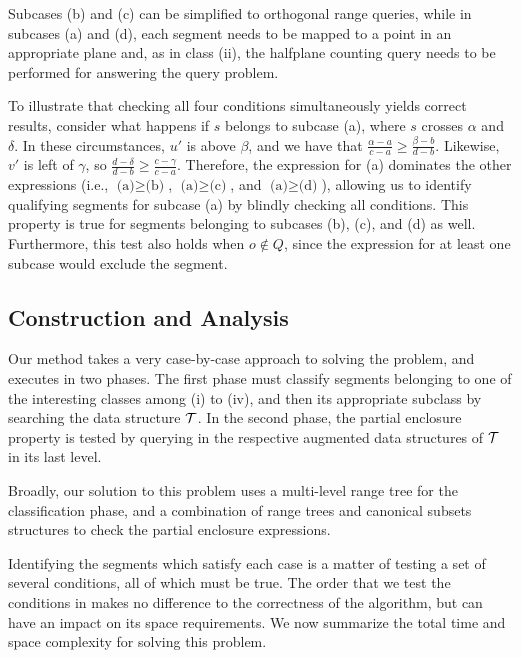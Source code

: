 Subcases (b) and (c) can be simplified to orthogonal range 
queries, while in subcases (a) and (d), each segment needs to be mapped to 
a point in an appropriate plane and, as in class 
(ii), the halfplane counting query needs to be performed for answering 
the query problem. 

To illustrate that checking all four conditions simultaneously 
yields correct results, consider what happens if $s$ belongs 
to subcase (a), where $s$ crosses $\alpha$ and $\delta$. In 
these circumstances, $u'$ is above $\beta$, and we have that 
$\frac{\alpha - a}{c - a} \geq \frac{\beta - b}{d - b}$.  
Likewise, $v'$ is left of $\gamma$, so $\frac{d - \delta}{d - b} 
\geq \frac{c - \gamma}{c - a}$.  Therefore, the expression for 
(a) dominates the other expressions (i.e., $\text{(a)} \geq 
\text{(b)}$, $\text{(a)} \geq \text{(c)}$, and $\text{(a)} \geq 
\text{(d)}$), allowing us to identify qualifying segments for 
subcase (a) by blindly checking all conditions. This property 
is true for segments belonging to subcases (b), (c), and (d) 
as well. Furthermore, this test also holds when $o \not \in Q$, 
since the expression for at least one subcase would exclude the 
segment.


\subsection{Construction and Analysis}
\label{:rectangles:ao:analysis}

Our method takes a very case-by-case approach to solving the problem, 
and executes in two phases. The first phase must classify segments 
belonging to one of the interesting classes among (i) to (iv), and then 
its appropriate subclass by searching the data structure $\cal T$.  
In the second phase, the partial enclosure property is tested by 
querying in the respective augmented data structures of $\cal T$ in 
its last level. 

Broadly, our solution to this problem uses a multi-level range tree 
\cite{Deberg} for the classification phase, and a combination of 
range trees and canonical subsets structures \cite{chan2012} to 
check the partial enclosure expressions. 

Identifying the segments which satisfy each case is a matter of 
testing a set of several conditions, all of which must be true. 
The order that we test the conditions in makes no difference to 
the correctness of the algorithm, but can have an impact on its 
space requirements. We now summarize the total time and space 
complexity for solving this problem. 

